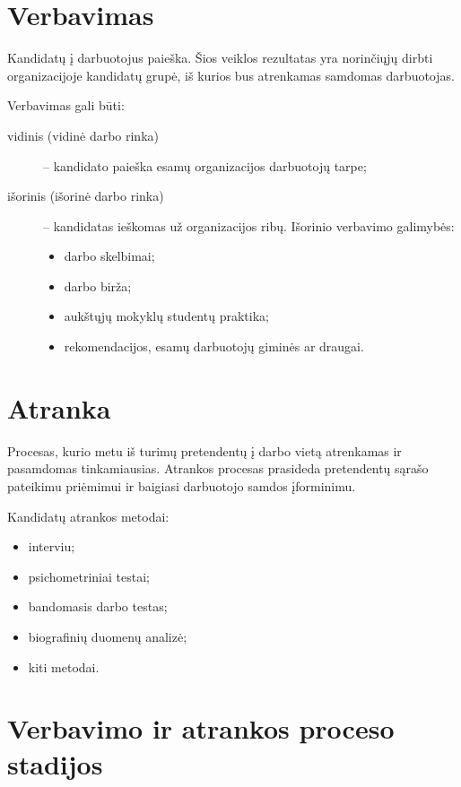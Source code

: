 \section{Verbavimas}

\begin{defn}[Verbavimas]
  Kandidatų į darbuotojus paieška. Šios veiklos rezultatas yra norinčiųjų
  dirbti organizacijoje kandidatų grupė, iš kurios bus atrenkamas
  samdomas darbuotojas.
\end{defn}

Verbavimas gali būti:
\begin{description}
  \item[vidinis (vidinė darbo rinka)] – kandidato paieška esamų
    organizacijos darbuotojų tarpe;
  \item[išorinis (išorinė darbo rinka)] – kandidatas ieškomas už
    organizacijos ribų. Išorinio verbavimo galimybės:
    \begin{itemize}
      \item darbo skelbimai;
      \item darbo birža;
      \item aukštųjų mokyklų studentų praktika;
      \item rekomendacijos, esamų darbuotojų giminės ar draugai.
    \end{itemize}
\end{description}

\section{Atranka}

\begin{defn}[Atranka]
  Procesas, kurio metu iš turimų pretendentų į darbo vietą atrenkamas
  ir pasamdomas tinkamiausias. Atrankos procesas prasideda pretendentų
  sąrašo pateikimu priėmimui ir baigiasi darbuotojo samdos įforminimu.
\end{defn}

Kandidatų atrankos metodai:
\begin{itemize}
  \item interviu;
  \item psichometriniai testai;
  \item bandomasis darbo testas;
  \item biografinių duomenų analizė;
  \item kiti metodai.
\end{itemize}

\section{Verbavimo ir atrankos proceso stadijos}

